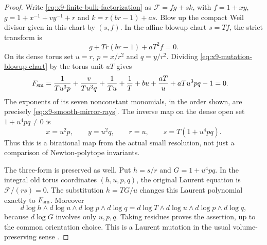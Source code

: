 \begin{proof}
Write \eqref{eq:x9-finite-bulk-factorization} as
$\mathcal F=fg+sk$, with
$f=1+xy$, $g=1+x^{-1}+vy^{-1}+r$ and $k=r(br-1)+as$.
Blow up the compact Weil divisor given in this chart by $(s,f)$.
In the affine blowup chart $s=Tf$, the strict transform is
\begin{equation}
 g+Tr(br-1)+aT^2f=0.
 \label{eq:x9-mutation-blowup-chart}
\end{equation}
On its dense torus set $u=r$, $p=x/r^2$ and $q=y/r^2$.
Dividing \eqref{eq:x9-mutation-blowup-chart} by the torus unit $uT$
gives
\begin{equation}
 \begin{aligned}
 F_{\rm sm}={}&\frac{1}{Tu^3p}+\frac{v}{Tu^3q}
       +\frac{1}{Tu}+\frac{1}{T}+bu
       +\frac{aT}{u}+aTu^3pq-1=0.
 \end{aligned}
 \label{eq:x9-mutated-mirror}
\end{equation}
The exponents of its seven nonconstant monomials, in the order
shown, are precisely \eqref{eq:x9-smooth-mirror-rays}.
The inverse map on the dense open set $1+u^4pq\ne0$ is
\begin{equation}
 x=u^2p,\qquad y=u^2q,\qquad r=u,\qquad
 s=T(1+u^4pq).
 \label{eq:x9-mutation-map}
\end{equation}
Thus this is a birational map from the actual small resolution,
not just a comparison of Newton-polytope invariants.

The three-form is preserved as well. Put $h=s/r$ and
$G=1+u^4pq$. In the integral old torus coordinates $(h,u,p,q)$,
the original Laurent equation is $\mathcal F/(rs)=0$.
The substitution $h=TG/u$ changes this Laurent polynomial
exactly to $F_{\rm sm}$. Moreover
\begin{equation}
 d\log h\wedge d\log u\wedge d\log p\wedge d\log q
 =d\log T\wedge d\log u\wedge d\log p\wedge d\log q,
 \label{eq:x9-mutation-volume}
\end{equation}
because $d\log G$ involves only $u,p,q$.
Taking residues proves the assertion, up to the common orientation
choice. This is a Laurent mutation in the usual volume-preserving
sense \cite[Definition~1.1]{Ilten:2012Mutation}.


\end{proof}
